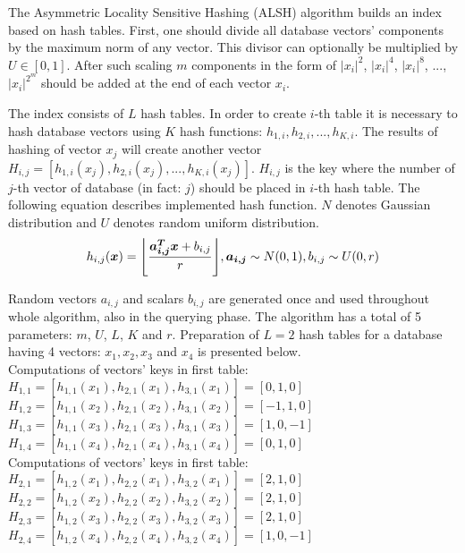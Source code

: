 The Asymmetric Locality Sensitive Hashing (ALSH) \cite{alsh} algorithm builds an index based on hash tables.
First, one should divide all database vectors' components by the maximum norm of any vector.
This divisor can optionally be multiplied by $U \in [0,1]$.
After such scaling $m$ components in the form of $|x_i|^2$, $|x_i|^4$, $|x_i|^8$, $ ...$, $|x_i|^{2^m}$ should be added at the end of each vector $x_i$.
\par
The index consists of $L$ hash tables.
In order to create $i$-th table it is necessary to hash database vectors using $K$ hash functions: $h_{1,i}, h_{2,i}, ..., h_{K,i}$.
The results of hashing of vector $x_j$ will create another vector $H_{i,j} = [h_{1,i}(x_j), h_{2,i}(x_j), ..., h_{K,i}(x_j)]$. $H_{i,j}$ is the key where the number of $j$-th vector of database (in fact: $j$) should be placed in $i$-th hash table.
The following equation describes implemented hash function.
$N$ denotes Gaussian distribution and $U$ denotes random uniform distribution.
\begin{equation*}
h_{i,j}(\bm{x}) = \floor*{\frac{\bm{a_{i,j}^T x} + b_{i,j}}{r}}, \bm{a_{i,j}} \sim N(0,1), b_{i,j} \sim U(0,r)
\end{equation*}
\par
Random vectors $a_{i,j}$ and scalars $b_{i,j}$ are generated once and used throughout whole algorithm, also in the querying phase. The algorithm has a total of 5 parameters: $m$, $U$, $L$, $K$ and $r$.
Preparation of $L = 2$ hash tables for a database having 4 vectors: $x_1, x_2, x_3$ and $x_4$ is presented below.
\\
Computations of vectors' keys in first table:\\
$H_{1,1} = [h_{1,1}(x_1), h_{2,1}(x_1), h_{3,1}(x_1)] = [0, 1, 0]$\\
$H_{1,2} = [h_{1,1}(x_2), h_{2,1}(x_2), h_{3,1}(x_2)] = [-1, 1, 0]$\\
$H_{1,3} = [h_{1,1}(x_3), h_{2,1}(x_3), h_{3,1}(x_3)] = [1, 0, -1]$\\
$H_{1,4} = [h_{1,1}(x_4), h_{2,1}(x_4), h_{3,1}(x_4)] = [0, 1, 0]$\\
Computations of vectors' keys in first table:\\
$H_{2,1} = [h_{1,2}(x_1), h_{2,2}(x_1), h_{3,2}(x_1)] = [2, 1, 0]$\\
$H_{2,2} = [h_{1,2}(x_2), h_{2,2}(x_2), h_{3,2}(x_2)] = [2, 1, 0]$\\
$H_{2,3} = [h_{1,2}(x_3), h_{2,2}(x_3), h_{3,2}(x_3)] = [2, 1, 0]$\\
$H_{2,4} = [h_{1,2}(x_4), h_{2,2}(x_4), h_{3,2}(x_4)] = [1, 0, -1]$\\
